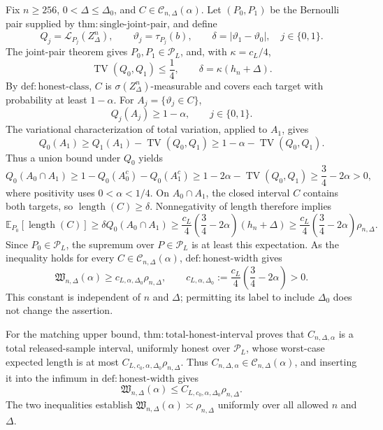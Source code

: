 Fix \(n\geq256\), \(0<\Delta\leq\Delta_0\), and \(C\in\mathcal C_{n,\Delta}(\alpha)\).  Let \((P_0,P_1)\) be the Bernoulli pair supplied by \(\mathrm{thm:single\text{-}joint\text{-}pair}\), and define
\[
 Q_j=\mathcal L_{P_j}(Z_\Delta^n),
 \qquad
 \vartheta_j=\tau_{P_j}(b),
 \qquad
 \delta=|\vartheta_1-\vartheta_0|,
 \quad j\in\{0,1\}.
\]
The joint-pair theorem gives \(P_0,P_1\in\mathcal P_L\), and, with \(\kappa=c_L/4\),
\[
 \operatorname{TV}(Q_0,Q_1)\leq\frac14,
 \qquad
 \delta=\kappa(h_n+\Delta).
\]
By \(\mathrm{def:honest\text{-}class}\), \(C\) is \(\sigma(Z_\Delta^n)\)-measurable and covers each target with probability at least \(1-\alpha\).  For \(A_j=\{\vartheta_j\in C\}\),
\[
 Q_j(A_j)\geq1-\alpha,
 \qquad j\in\{0,1\}.
\]
The variational characterization of total variation, applied to \(A_1\), gives
\[
 Q_0(A_1)\geq Q_1(A_1)-\operatorname{TV}(Q_0,Q_1)
 \geq1-\alpha-\operatorname{TV}(Q_0,Q_1).
\]
Thus a union bound under \(Q_0\) yields
\[
 Q_0(A_0\cap A_1)
 \geq1-Q_0(A_0^c)-Q_0(A_1^c)
 \geq1-2\alpha-\operatorname{TV}(Q_0,Q_1)
 \geq\frac34-2\alpha>0,
\]
where positivity uses \(0<\alpha<1/4\).  On \(A_0\cap A_1\), the closed interval \(C\) contains both targets, so \(\operatorname{length}(C)\geq\delta\).  Nonnegativity of length therefore implies
\[
 \mathbb E_{P_0}[\operatorname{length}(C)]
 \geq\delta Q_0(A_0\cap A_1)
 \geq\frac{c_L}{4}\left(\frac34-2\alpha\right)(h_n+\Delta)
 \geq\frac{c_L}{4}\left(\frac34-2\alpha\right)\rho_{n,\Delta}.
\]
Since \(P_0\in\mathcal P_L\), the supremum over \(P\in\mathcal P_L\) is at least this expectation.  As the inequality holds for every \(C\in\mathcal C_{n,\Delta}(\alpha)\), \(\mathrm{def:honest\text{-}width}\) gives
\[
 \mathfrak W_{n,\Delta}(\alpha)
 \geq c_{L,\alpha,\Delta_0}\rho_{n,\Delta},
 \qquad
 c_{L,\alpha,\Delta_0}:=\frac{c_L}{4}\left(\frac34-2\alpha\right)>0.
\]
This constant is independent of \(n\) and \(\Delta\); permitting its label to include \(\Delta_0\) does not change the assertion.

For the matching upper bound, \(\mathrm{thm:total\text{-}honest\text{-}interval}\) proves that \(C_{n,\Delta,\alpha}\) is a total released-sample interval, uniformly honest over \(\mathcal P_L\), whose worst-case expected length is at most \(C_{L,c_0,\alpha,\Delta_0}\rho_{n,\Delta}\).  Thus \(C_{n,\Delta,\alpha}\in\mathcal C_{n,\Delta}(\alpha)\), and inserting it into the infimum in \(\mathrm{def:honest\text{-}width}\) gives
\[
 \mathfrak W_{n,\Delta}(\alpha)
 \leq C_{L,c_0,\alpha,\Delta_0}\rho_{n,\Delta}.
\]
The two inequalities establish \(\mathfrak W_{n,\Delta}(\alpha)\asymp\rho_{n,\Delta}\) uniformly over all allowed \(n\) and \(\Delta\).
